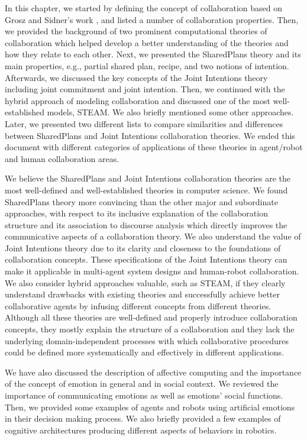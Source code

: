 \documentclass[12pt]{report}
\begin{document}
In this chapter, we started by defining the concept of collaboration based
on Grosz and Sidner's work \cite{grosz:plans-discourse}, and listed a number of
collaboration properties. Then, we provided the background of two prominent
computational theories of collaboration which helped develop a better
understanding of the theories and how they relate to each other. Next, we
presented the SharedPlans theory and its main properties, e.g., partial shared
plan, recipe, and two notions of intention. Afterwards, we discussed the key
concepts of the Joint Intentions theory including joint commitment and joint
intention. Then, we continued with the hybrid approach of modeling collaboration
and discussed one of the most well-established models, STEAM. We also briefly
mentioned some other approaches. Later, we presented two different lists to
compare similarities and differences between SharedPlans and Joint Intentions
collaboration theories. We ended this document with different categories of
applications of these theories in agent/robot and human collaboration areas.

We believe the SharedPlans and Joint Intentions collaboration theories are the
most well-defined and well-established theories in computer science. We found
SharedPlans theory more convincing than the other major and subordinate
approaches, with respect to its inclusive explanation of the collaboration
structure and its association to discourse analysis which directly improves the
communicative aspects of a collaboration theory. We also understand the value of
Joint Intentions theory due to its clarity and closeness to the foundations of
collaboration concepts. These specifications of the Joint Intentions theory can
make it applicable in multi-agent system designs and human-robot collaboration.
We also consider hybrid approaches valuable, such as STEAM, if they clearly
understand drawbacks with existing theories and successfully achieve better
collaborative agents by infusing different concepts from different theories.
Although all these theories are well-defined and properly introduce
collaboration concepts, they mostly explain the structure of a collaboration and
they lack the underlying domain-independent processes with which collaborative
procedures could be defined more systematically and effectively in different
applications.

We have also discussed the description of affective computing and the importance
of the concept of emotion in general and in social context. We reviewed the
importance of communicating emotions as well as emotions' social functions.
Then, we provided some examples of agents and robots using artificial emotions
in their decision making process. We also briefly provided a few examples of
cognitive architectures producing different aspects of behaviors in robotics.
\end{document}
